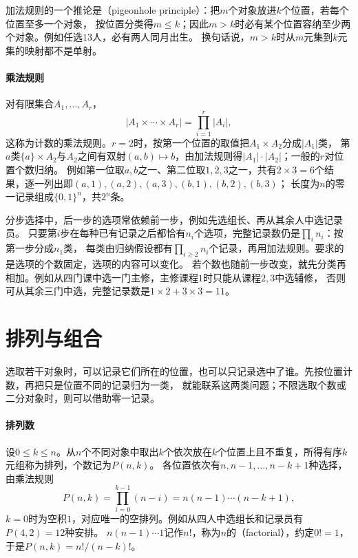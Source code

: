 加法规则的一个推论是（pigeonhole principle）：把$m$个对象放进$k$个位置，若每个位置至多一个对象，
按位置分类得$m\leq k$；因此$m>k$时必有某个位置容纳至少两个对象。例如任选$13$人，必有两人同月出生。
换句话说，$m>k$时从$m$元集到$k$元集的映射都不是单射。

\paragraph{乘法规则}
\label{sec:comb-stepwise-counting}
对有限集合$A_1,\ldots,A_r$，
\[
 |A_1\times\cdots\times A_r|=\prod_{i=1}^r|A_i|,
\]
这称为计数的乘法规则。$r=2$时，按第一个位置的取值把$A_1\times A_2$分成$|A_1|$类，
第$a$类$\{a\}\times A_2$与$A_2$之间有双射$(a,b)\mapsto b$，由加法规则得$|A_1|\cdot|A_2|$；一般的$r$对位置个数归纳。
例如第一位取$a,b$之一、第二位取$1,2,3$之一，共有$2\times3=6$个结果，逐一列出即$(a,1),(a,2),(a,3),(b,1),(b,2),(b,3)$；
长度为$n$的零一记录组成$\{0,1\}^n$，共$2^n$条。

分步选择中，后一步的选项常依赖前一步，例如先选组长、再从其余人中选记录员。
只要第$i$步在每种已有记录之后都恰有$n_i$个选项，完整记录数仍是$\prod_in_i$：按第一步分成$n_1$类，
每类由归纳假设都有$\prod_{i\geq2}n_i$个记录，再用加法规则。要求的是选项的个数固定，选项的内容可以变化。
若个数也随前一步改变，就先分类再相加。例如从四门课中选一门主修，主修课程$1$时只能从课程$2,3$中选辅修，
否则可从其余三门中选，完整记录数是$1\times2+3\times3=11$。

\section{排列与组合}
\label{sec:comb-permutation-combination-counts}
\label{sec:comb-subset-partition-counts}

选取若干对象时，可以记录它们所在的位置，也可以只记录选中了谁。先按位置计数，再把只是位置不同的记录归为一类，
就能联系这两类问题；不限选取个数或二分对象时，则可以借助零一记录。

\paragraph{排列数}
设$0\leq k\leq n$。从$n$个不同对象中取出$k$个依次放在$k$个位置上且不重复，所得有序$k$元组称为排列，个数记为$P(n,k)$。
各位置依次有$n,n-1,\ldots,n-k+1$种选择，由乘法规则
\[
 P(n,k)=\prod_{i=0}^{k-1}(n-i)=n(n-1)\cdots(n-k+1),
\]
$k=0$时为空积$1$，对应唯一的空排列。例如从四人中选组长和记录员有$P(4,2)=12$种安排。
$n(n-1)\cdots1$记作$n!$，称为$n$的（factorial），约定$0!=1$，于是$P(n,k)=n!/(n-k)!$。

